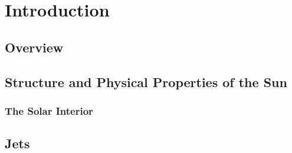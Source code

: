 \documentclass[12pt]{ociamthesis}
\begin{document}
\chapter{Introduction}
\label{chap:intro}
\citep{Alissandrakis1971SoPh2047A}
\section{Overview}
\label{sec:overview}

\section{Structure and Physical Properties of the Sun}
\label{sec:structure}

\subsection{The Solar Interior}
\label{subsec:interior}

\section{Jets}
\label{sec:Jets}
\end{document}
